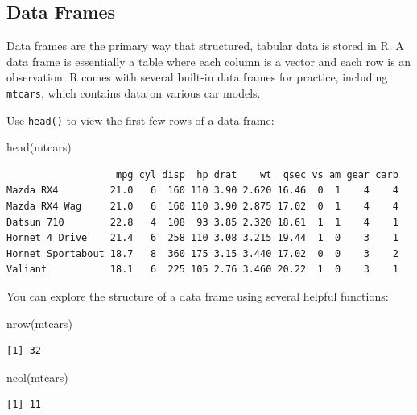\documentclass[
  letterpaper,
  DIV=11,
  numbers=noendperiod]{scrreprt}
\newenvironment{Shaded}{\begin{snugshade}}{\end{snugshade}}
\newcommand{\FunctionTok}[1]{\textcolor[rgb]{0.28,0.35,0.67}{#1}}
\newcommand{\NormalTok}[1]{\textcolor[rgb]{0.00,0.23,0.31}{#1}}
\begin{document}
\subsection{Data Frames}\label{data-frames}

Data frames are the primary way that structured, tabular data is stored
in R. A data frame is essentially a table where each column is a vector
and each row is an observation. R comes with several built-in data
frames for practice, including \texttt{mtcars}, which contains data on
various car models.

Use \texttt{head()} to view the first few rows of a data frame:

\begin{Shaded}
\begin{Highlighting}[]
\FunctionTok{head}\NormalTok{(mtcars)}
\end{Highlighting}
\end{Shaded}

\begin{verbatim}
                   mpg cyl disp  hp drat    wt  qsec vs am gear carb
Mazda RX4         21.0   6  160 110 3.90 2.620 16.46  0  1    4    4
Mazda RX4 Wag     21.0   6  160 110 3.90 2.875 17.02  0  1    4    4
Datsun 710        22.8   4  108  93 3.85 2.320 18.61  1  1    4    1
Hornet 4 Drive    21.4   6  258 110 3.08 3.215 19.44  1  0    3    1
Hornet Sportabout 18.7   8  360 175 3.15 3.440 17.02  0  0    3    2
Valiant           18.1   6  225 105 2.76 3.460 20.22  1  0    3    1
\end{verbatim}

You can explore the structure of a data frame using several helpful
functions:

\begin{Shaded}
\begin{Highlighting}[]
\FunctionTok{nrow}\NormalTok{(mtcars)}
\end{Highlighting}
\end{Shaded}

\begin{verbatim}
[1] 32
\end{verbatim}

\begin{Shaded}
\begin{Highlighting}[]
\FunctionTok{ncol}\NormalTok{(mtcars)}
\end{Highlighting}
\end{Shaded}

\begin{verbatim}
[1] 11
\end{verbatim}
\end{document}
